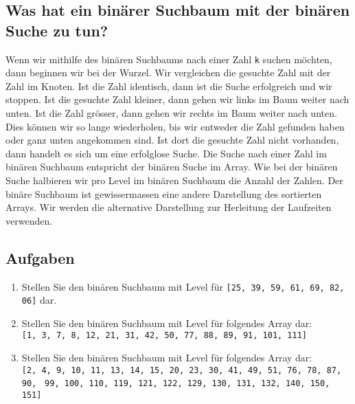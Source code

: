 \subsection{Was hat ein binärer Suchbaum mit der binären Suche zu tun?}

Wenn wir mithilfe des binären Suchbaums nach einer Zahl \lstinline[language=pseudocode]{k} suchen möchten, dann beginnen wir bei der Wurzel. Wir vergleichen die gesuchte Zahl mit der Zahl im Knoten. Ist die Zahl identisch, dann ist die Suche erfolgreich und wir stoppen. Ist die gesuchte Zahl kleiner, dann gehen wir links im Baum weiter nach unten. Ist die Zahl grösser, dann gehen wir rechts im Baum weiter nach unten. Dies können wir so lange wiederholen, bis wir entweder die Zahl gefunden haben oder ganz unten angekommen sind. Ist dort die gesuchte Zahl nicht vorhanden, dann handelt es sich um eine erfolglose Suche. Die Suche nach einer Zahl im binären Suchbaum entspricht der binären Suche im Array. Wie bei der binären Suche halbieren wir pro Level im binären Suchbaum die Anzahl der Zahlen. Der binäre Suchbaum ist gewissermassen eine andere Darstellung des sortierten Arrays. Wir werden die alternative Darstellung zur Herleitung der Laufzeiten verwenden.

\subsection{Aufgaben}

\begin{enumerate}
	\item Stellen Sie den binären Suchbaum mit Level für \lstinline[language=pseudocode]{[25, 39, 59, 61, 69, 82, 06]} dar.
	
	\fillwithgrid{1.5in}
	
	\item Stellen Sie den binären Suchbaum mit Level für folgendes Array dar: \\ \lstinline[language=pseudocode]{[1, 3, 7, 8, 12, 21, 31, 42, 50, 77, 88, 89, 91, 101, 111]}
	
	\fillwithgrid{2in}
	
	\item Stellen Sie den binären Suchbaum mit Level für folgendes Array dar: \\ \lstinline[language=pseudocode]{[2, 4, 9, 10, 11, 13, 14, 15, 20, 23, 30, 41, 49, 51, 76, 78, 87, 90, } \lstinline[language=pseudocode]{99, 100, 110, 119, 121, 122, 129, 130, 131, 132, 140, 150, 151]}
	
	
\end{enumerate}

